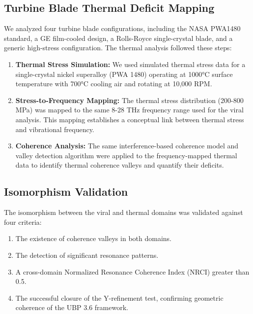 \documentclass[11pt, a4paper]{article}
\begin{document}
\subsection{Turbine Blade Thermal Deficit Mapping}
We analyzed four turbine blade configurations, including the NASA PWA1480 standard, a GE film-cooled design, a Rolls-Royce single-crystal blade, and a generic high-stress configuration. The thermal analysis followed these steps:

\begin{enumerate}
    \item \textbf{Thermal Stress Simulation:} We used simulated thermal stress data for a single-crystal nickel superalloy (PWA 1480) operating at 1000°C surface temperature with 700°C cooling air and rotating at 10,000 RPM.
    \item \textbf{Stress-to-Frequency Mapping:} The thermal stress distribution (200-800 MPa) was mapped to the same 8-28 THz frequency range used for the viral analysis. This mapping establishes a conceptual link between thermal stress and vibrational frequency.
    \item \textbf{Coherence Analysis:} The same interference-based coherence model and valley detection algorithm were applied to the frequency-mapped thermal data to identify thermal coherence valleys and quantify their deficits.
\end{enumerate}

\subsection{Isomorphism Validation}
The isomorphism between the viral and thermal domains was validated against four criteria:
\begin{enumerate}
    \item The existence of coherence valleys in both domains.
    \item The detection of significant resonance patterns.
    \item A cross-domain Normalized Resonance Coherence Index (NRCI) greater than 0.5.
    \item The successful closure of the Y-refinement test, confirming geometric coherence of the UBP 3.6 framework.
\end{enumerate}
\end{document}
